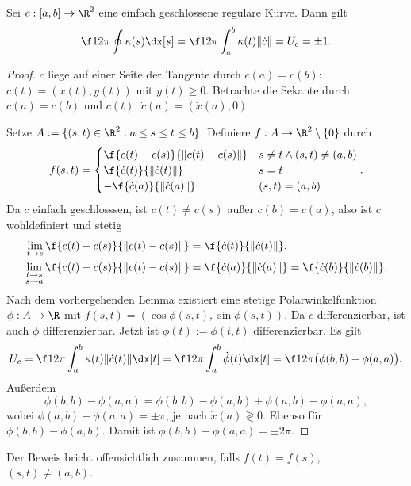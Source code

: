 \begin{thm}
	Sei $c: [a,b] \to \R^2$ eine einfach geschlossene reguläre Kurve.
	Dann gilt
	\[
		\f 1{2\pi} \oint \kappa(s) \dx[s]
		= \f 1{2\pi} \int_a^b \kappa(t) \|\dot c\|
		= U_c
		= \pm 1.
	\]
	\begin{proof}
		$c$ liege \oBdA auf einer Seite der Tangente durch $c(a) = c(b)$:
		$c(t) = (x(t), y(t))$ mit $y(t) \ge 0$.
		Betrachte die Sekante durch $c(a) = c(b)$ und $c(t)$.
		$\dot c(a) = (\dot x(a), 0)$

		Setze $A := \{ (s,t) \in \R^2 : a \le s \le t \le b \}$.
		Definiere $f: A \to \R^2 \setminus \{0\}$ durch
		\[
			f(s,t)
			= \begin{cases}
				\f {c(t) - c(s)}{\|c(t) - c(s)\|} & s \neq t \land (s,t) \neq (a,b) \\
				\f {\dot c(t)}{\|\dot c(t)\|} & s = t \\
				- \f {\dot c(a)}{\|\dot c(a)\|} & (s,t) = (a,b)
			\end{cases}.
		\]
		Da $c$ einfach geschlosssen, ist $c(t) \neq c(s)$ außer $c(b) = c(a)$, also ist $c$ wohldefiniert und stetig
		\begin{align*}
			\lim_{t\to s} \f{c(t) - c(s)}{\|c(t) - c(s)\|}
			&= \f{\dot c(t)}{\|\dot c(t)\|}, \\
			\lim_{\substack{t\to s \\ s\to a}} \f{c(t) - c(s)}{\|c(t) - c(s)\|}
			&= \f{\dot c(a)}{\|\dot c(a)\|}
			= \f{\dot c(b)}{\|\dot c(b)\|}.
		\end{align*}
		Nach dem vorhergehenden Lemma existiert eine stetige Polarwinkelfunktion $\phi: A \to \R$ mit $f(s, t) = (\cos \phi(s,t), \sin \phi(s,t) )$.
		Da $c$ differenzierbar, ist auch $\phi$ differenzierbar.
		Jetzt ist $\phi(t) := \phi(t, t)$ differenzierbar.
		Es gilt
		\[
			U_c
			= \f 1{2\pi} \int_a^b \kappa(t) \|\dot c(t) \| \dx[t]
			= \f 1{2\pi} \int_a^b \dot \phi(t) \dx[t]
			= \f 1{2\pi} \big( \phi(b,b) - \phi(a,a) \big).
		\]
		Außerdem
		\[
			\phi(b,b) - \phi(a,a)
			= \phi(b,b) - \phi(a,b) + \phi(a,b) - \phi(a,a),
		\]
		wobei $\phi(a,b) - \phi(a,a) = \pm \pi$, je nach $\dot x(a) \gtrless 0$.
		Ebenso für $\phi(b,b) - \phi(a,b)$.
		Damit ist $\phi(b,b) - \phi(a,a) = \pm 2\pi$.
	\end{proof}
	\begin{note}
		Der Beweis bricht offensichtlich zusammen, falls $f(t) = f(s)$, $(s,t) \neq (a,b)$.
	\end{note}
\end{thm}

